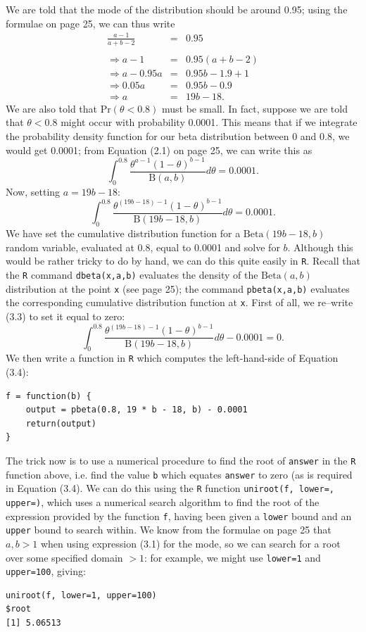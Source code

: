 {We are told that the mode of the distribution should be around 0.95; using the formulae on page 25, we can thus write
\begin{eqnarray}
\frac{a-1}{a+b-2}    &=& 0.95  \\
                     & &      \nonumber \\
 \Rightarrow a-1     &=&0.95(a+b-2)  \nonumber \\
 \Rightarrow a-0.95a &=&0.95b - 1.9 + 1 \nonumber \\
 \Rightarrow 0.05a   &=&0.95b - 0.9 \nonumber \\
 \Rightarrow   a     &=&19b - 18.
\end{eqnarray}
We are also told that $\text{Pr}(\theta<0.8)$ must be small.  In fact, suppose we are told that $\theta<0.8$ might occur with probability 0.0001.  This means that if we integrate the probability density function for our beta distribution between 0 and 0.8, we would get 0.0001; from Equation (2.1) on page 25, we can write this as
$$\int_{0}^{0.8} \frac{\theta^{a-1}(1-\theta)^{b-1}}{\mathrm{B}(a,b)} d\theta = 0.0001. $$
Now, setting $a = 19b-18$:
\begin{equation}
 \int_{0}^{0.8} \frac{\theta^{(19b-18)-1}(1-\theta)^{b-1}}{\mathrm{B}(19b-18,b)} d\theta = 0.0001.
\end{equation}
We have set the cumulative distribution function for a $\text{Beta}(19b-18,b)$ random variable, evaluated at 0.8, equal to 0.0001 and solve for $b$.  Although this would be rather tricky to do by hand, we can do this quite easily in \texttt{R}.  Recall that the \texttt{R} command \texttt{dbeta(x,a,b)} evaluates the density of the $\text{Beta}(a,b)$ distribution at the point \texttt{x} (see page 25); the command \texttt{pbeta(x,a,b)} evaluates the corresponding cumulative distribution function at \texttt{x}.  First of all, we re--write (3.3) to set it equal to zero:
\begin{equation}
\int_{0}^{0.8} \frac{\theta^{(19b-18)-1}(1-\theta)^{b-1}}{\mathrm{B}(19b-18,b)} d\theta -0.0001 = 0.
\end{equation}
We then write a function in \texttt{R} which computes the left-hand-side of Equation (3.4):
\begin{verbatim}
f = function(b) {
    output = pbeta(0.8, 19 * b - 18, b) - 0.0001
    return(output)
}
\end{verbatim}
The trick now is to use a numerical procedure to find the root of \texttt{answer} in the \texttt{R} function above, i.e. find the value \texttt{b} which equates \texttt{answer} to zero (as is required in Equation (3.4).  We can do this using the \texttt{R} function \texttt{uniroot(f, lower=, upper=)}, which uses a numerical search algorithm to find the root of the expression provided by the function \texttt{f}, having been given a \texttt{lower} bound and an \texttt{upper} bound to search within.  We know from the formulae on page 25 that $a,b>1$ when using expression (3.1) for the mode, so we can search for a root over some specified domain $>1$: for example, we might use \texttt{lower=1} and \texttt{upper=100}, giving:
\begin{verbatim}
uniroot(f, lower=1, upper=100)
$root
[1] 5.06513


\end{verbatim}}
